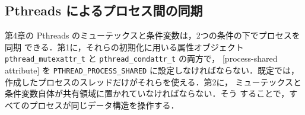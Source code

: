 \documentclass[../main.tex]{subfiles}
\begin{document}
\subsection{Pthreads によるプロセス間の同期}

\begin{sloppypar}
第4章の Pthreads のミューテックスと条件変数は，2つの条件の下でプロセスを同期
できる．第1に，それらの初期化に用いる属性オブジェクト
\texttt{pthread\_\allowbreak mutexattr\_t} と \texttt{pthread\_\allowbreak condattr\_t} の両方で，
[process-shared attribute]
を \texttt{PTHREAD\_\allowbreak PROCESS\_\allowbreak SHARED} に設定しなければならない．既定では，作成したプロセスのスレッドだけがそれらを使える．第2に，
ミューテックスと条件変数自体が共有領域に置かれていなければならない．そう
することで，すべてのプロセスが同じデータ構造を操作する．
\end{sloppypar}
\end{document}
